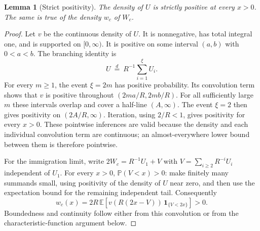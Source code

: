 \documentclass[11pt,a4paper]{article}
\newtheorem{lemma}[theorem]{Lemma}
\theoremstyle{remark}\newtheorem{remark}[theorem]{Remark}
\newcommand{\E}{\mathbb E}\newcommand{\Pp}{\mathbb P}
\begin{document}
\begin{lemma}[Strict positivity]\label{lem:positive}
The density of $U$ is strictly positive at every $x>0$. The same is true of the density $w_c$ of $W_c$.
\end{lemma}
\begin{proof}
Let $v$ be the continuous density of $U$. It is nonnegative, has total integral one, and is supported on $[0,\infty)$. It is positive on some interval $(a,b)$ with $0<a<b$. The branching identity is
\[
U\ \stackrel d=\ R^{-1}\sum_{i=1}^{\xi}U_i.
\]
For every $m\ge1$, the event $\xi=2m$ has positive probability. Its convolution term shows that $v$ is positive throughout $(2ma/R,2mb/R)$. For all sufficiently large $m$ these intervals overlap and cover a half-line $(A,\infty)$. The event $\xi=2$ then gives positivity on $(2A/R,\infty)$. Iteration, using $2/R<1$, gives positivity for every $x>0$. These pointwise inferences are valid because the density and each individual convolution term are continuous; an almost-everywhere lower bound between them is therefore pointwise.

For the immigration limit, write
$2W_c=R^{-1}U_1+V$ with $V=\sum_{i\ge2}R^{-i}U_i$ independent of $U_1$. For every $x>0$, $\Pp(V<x)>0$: make finitely many summands small, using positivity of the density of $U$ near zero, and then use the expectation bound for the remaining independent tail. Consequently
\[
w_c(x)=2R\,\E\!\left[v(R(2x-V))\,\mathbf1_{\{V<2x\}}\right]>0.
\]
Boundedness and continuity follow either from this convolution or from the characteristic-function argument below.
\end{proof}
\end{document}
